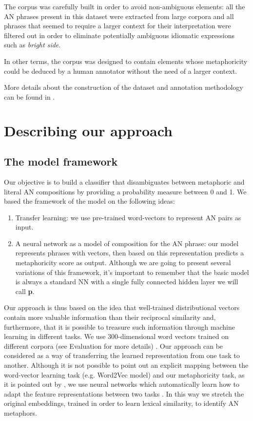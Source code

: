 The corpus was carefully built in order to avoid non-ambiguous elements: all the AN phrases present in this dataset were extracted from large corpora and all phrases that seemed to require a larger context for their interpretation were filtered out in order to eliminate potentially ambiguous idiomatic expressions such as \textit{bright side}. 

In other terms, the corpus was designed to contain elements whose metaphoricity could be deduced by a human annotator without the need of a larger context. 

More details about the construction of the dataset and annotation 
methodology can be found in \cite{gutierrez2016literal}.

\section{Describing our approach}

\subsection{The model framework}

Our objective is to build a classifier that disambiguates between metaphoric and literal AN compositions by providing a probability measure between 0 and 1. We based the framework of the model on the following ideas:
\begin{enumerate}[topsep=0em,itemsep=0em,partopsep=0em,parsep=0em]
	\item Transfer learning: we use pre-trained word-vectors to represent AN pairs as input. 
	\item A neural network as a model of composition for the AN phrase: our model represents phrases with vectors, then based on this representation predicts a metaphoricity score as output. Although we are going to present several variations of this framework, it's important to remember that the basic model is always a standard NN with a single fully connected hidden layer we will call \textbf{p}.
\end{enumerate}
Our approach is thus based on the idea that well-trained distributional vectors contain more valuable information than their reciprocal similarity and, furthermore, that it is possible to treasure such information through machine learning in different tasks. We use 300-dimensional word vectors trained on different corpora (see Evaluation for more details) . Our approach can be considered as a way of transferring the learned representation from one task to another. Although it is not possible to point out an explicit mapping between the word-vector learning task (e.g. Word2Vec model) and our metaphoricity task, as it is pointed out by \citealt{torrey2009transfer}, we use neural networks which automatically learn how to adapt the feature representations between two tasks \cite{bengio2013representation}.  In this way we stretch the original embeddings, trained in order to learn lexical similarity, to identify AN metaphors.

